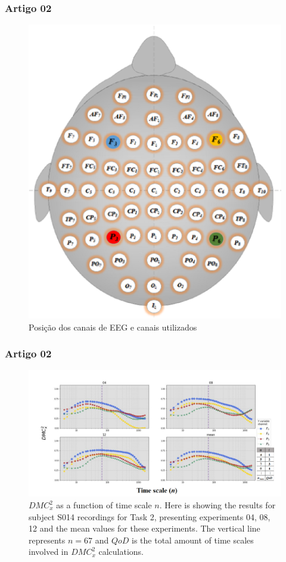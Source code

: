 \documentclass[11pt, aspectratio=169]{beamer}
\begin{document}
\begin{frame}
  \frametitle{Artigo 02}
  \begin{figure}[!h]
    \includegraphics[height=.6\paperheight]{../Figures/art_02/Fig1.png}
    \caption{Posição dos canais de EEG e canais utilizados}
    \label{fig01}
  \end{figure}
\end{frame}



\begin{frame}
  \frametitle{Artigo 02}

  \begin{figure}[!h]
    \includegraphics[height=.5\paperheight]{../Figures/art_02/Fig2.png}
    \caption{$DMC_{x}^{2}$ as a function of time scale $n$. Here is showing the results for subject S014 recordings for Task 2, presenting experiments 04, 08, 12 and the mean values for these experiments. The vertical line represents $n=67$ and $QoD$ is the total amount of time scales involved in $DMC_{x}^{2}$ calculations.}
    \label{fig02}
  \end{figure}
\end{frame}
\end{document}
